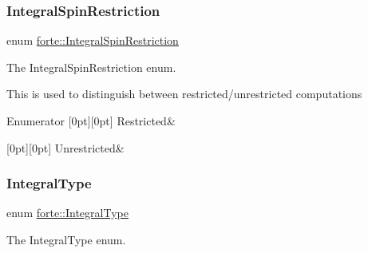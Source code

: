 \subsubsection{\texorpdfstring{Integral\+Spin\+Restriction}{IntegralSpinRestriction}}
{\footnotesize\ttfamily enum \mbox{\hyperlink{namespaceforte_a7defa2660dd3eb07aa81176b90781be7}{forte\+::\+Integral\+Spin\+Restriction}}\hspace{0.3cm}{\ttfamily [strong]}}



The Integral\+Spin\+Restriction enum. 

This is used to distinguish between restricted/unrestricted computations \begin{DoxyEnumFields}{Enumerator}
[0pt][0pt]{}\mbox{\label{namespaceforte_a7defa2660dd3eb07aa81176b90781be7aecdee5de15af6876cfab0801bb36f445}} 
Restricted&\\
\hline

[0pt][0pt]{}\mbox{\label{namespaceforte_a7defa2660dd3eb07aa81176b90781be7a89c6caacc7047b0a535412d7f939f870}} 
Unrestricted&\\
\hline

\end{DoxyEnumFields}
\mbox{\label{namespaceforte_a790e7e85ac0911c4c9494622496d95e6}} 
\subsubsection{\texorpdfstring{Integral\+Type}{IntegralType}}
{\footnotesize\ttfamily enum \mbox{\hyperlink{namespaceforte_a790e7e85ac0911c4c9494622496d95e6}{forte\+::\+Integral\+Type}}}



The Integral\+Type enum. 

